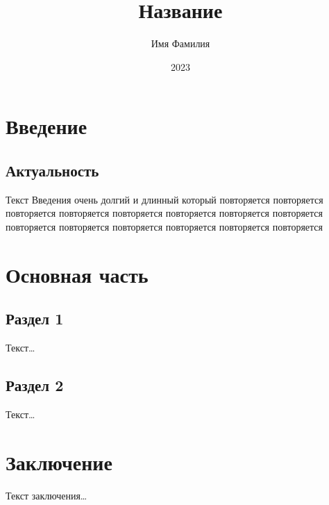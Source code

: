 \documentclass[a4paper,12pt]{article}
\begin{document}
  \title{Название}
  \author{Имя Фамилия}
  \date{2023}

  \maketitle

  \tableofcontents
  \newpage

  \section{Введение}
   \subsection{Актуальность}
     Текст Введения очень долгий и длинный который повторяется повторяется повторяется повторяется повторяется повторяется повторяется повторяется повторяется повторяется повторяется повторяется повторяется повторяется

  \section{Основная часть}
   \subsection{Раздел 1}
     Текст\dots

   \subsection{Раздел 2}
     Текст\dots

  \section{Заключение}
   Текст заключения\dots

   \printbibliography{}
\end{document}
